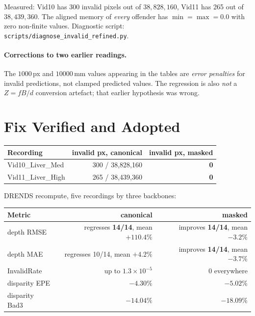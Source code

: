\documentclass[11pt,a4paper]{article}
\begin{document}
Measured: Vid10 has 300 invalid pixels out of $38{,}828{,}160$, Vid11
has 265 out of $38{,}439{,}360$. The aligned memory of \emph{every}
offender has $\min = \max = 0.0$ with zero non-finite values.
Diagnostic script:
\texttt{scripts/diagnose\_invalid\_refined.py}.

\paragraph{Corrections to two earlier readings.}
The $1000$\,px and $10000$\,mm values appearing in the tables are
\emph{error penalties} for invalid predictions, not clamped predicted
values. The regression is also \emph{not} a $Z = fB/d$ conversion
artefact; that earlier hypothesis was wrong.

\section*{Fix Verified and Adopted}

\begin{center}
\begin{tabular}{lrr}
\toprule
Recording & invalid px, canonical & invalid px, masked \\
\midrule
Vid10\_Liver\_Med  & 300 / 38{,}828{,}160 & \textbf{0} \\
Vid11\_Liver\_High & 265 / 38{,}439{,}360 & \textbf{0} \\
\bottomrule
\end{tabular}
\end{center}

DRENDS recompute, five recordings by three backbones:

\begin{center}
\begin{tabular}{lrr}
\toprule
Metric & canonical & masked \\
\midrule
depth RMSE      & regresses \textbf{14/14}, mean $+110.4\%$ & improves \textbf{14/14}, mean $-3.2\%$ \\
depth MAE       & regresses 10/14, mean $+4.2\%$            & improves \textbf{14/14}, mean $-3.7\%$ \\
InvalidRate     & up to $1.3\times10^{-5}$                  & $0$ everywhere \\
disparity EPE   & $-4.30\%$                                 & $\mathbf{-5.02\%}$ \\
disparity Bad3  & $-14.04\%$                                & $\mathbf{-18.09\%}$ \\
\bottomrule
\end{tabular}
\end{center}
\end{document}

